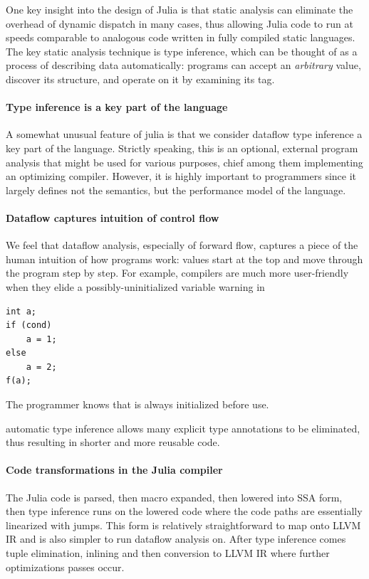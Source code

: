 \documentclass[pldi]{sigplanconf-pldi15}
\begin{document}
One key insight into the design of Julia is that static analysis can eliminate
the overhead of dynamic dispatch in many cases, thus allowing Julia code to run
at speeds comparable to analogous code written in fully compiled static
languages. The key static analysis technique is type inference, which can be
thought of as a process of describing data automatically: programs can accept
an \emph{arbitrary} value, discover its structure, and operate on it by
examining its tag.

\paragraph{Type inference is a key part of the language}
A somewhat unusual feature of julia is that we consider dataflow type inference a
key part of the language. Strictly speaking, this is an optional, external program
analysis that might be used for various purposes, chief among them implementing
an optimizing compiler. However, it is highly important to programmers since it
largely defines not the semantics, but the performance model of the language.

\paragraph{Dataflow captures intuition of control flow}
We feel that dataflow analysis, especially of forward flow, captures a piece of
the human intuition of how programs work: values start at the top and move through
the program step by step. For example, compilers are much more user-friendly
when they elide a possibly-uninitialized variable warning in

\begin{lstlisting}
int a;
if (cond)
    a = 1;
else
    a = 2;
f(a);
\end{lstlisting}

The programmer knows that  is always initialized before use.

automatic type inference allows many
explicit type annotations to be eliminated, thus resulting in shorter and more
reusable code.

\paragraph{Code transformations in the Julia compiler}
The Julia code is parsed, then macro expanded, then lowered into SSA form, then
type inference runs on the lowered code where the code paths are essentially
linearized with jumps. This form is relatively straightforward to map onto LLVM
IR and is also simpler to run dataflow analysis on. After type inference comes
tuple elimination, inlining and then conversion to LLVM IR where further
optimizations passes occur.
\end{document}
